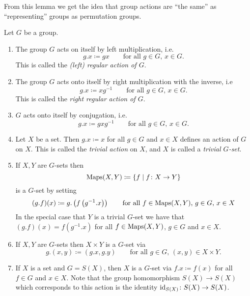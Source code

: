 From this lemma we get the idea that group actions are ``the same'' as ``representing'' groups as permutation groups.


\begin{expls}
  Let $G$ be a group.
  \begin{enumerate}[label=\emph{\alph*)},leftmargin=*]
    \item
      The group $G$ acts on itself by left multiplication, i.e.\
      \[
                  g.x
        \coloneqq gx
        \qquad
        \text{for all $g \in G$, $x \in G$}.
      \]
      This is called the \emph{\textup(left\textup) regular action of $G$}.
    \item
      The group $G$ acts onto itself by right multiplication with the inverse, i.e\
      \[
                  g.x
        \coloneqq xg^{-1}
        \qquad
        \text{for all $g \in G$, $x \in G$}.
      \]
      This is called the \emph{right regular action of $G$}.
    \item
      $G$ acts onto itself by conjugation, i.e.\
      \[
                  g.x
        \coloneqq gxg^{-1}
        \qquad
        \text{for all $g \in G$, $x \in G$}.
      \]
    \item
      Let $X$ be a set.
      Then $g.x \coloneqq x$ for all $g \in G$ and $x \in X$ defines an action of $G$ on $X$.
      This is called the \emph{trivial action} on $X$, and $X$ is called a \emph{trivial $G$-set}.
    \item
      If $X, Y$ are $G$-sets then
      \[
                  \operatorname{Maps}(X,Y)
        \coloneqq \{
                    f
                  \mid
                    f \colon X \to Y
                  \}
      \]
      is a $G$-set by setting
      \[
                  (g.f)(x)
        \coloneqq g.\left( f\left( g^{-1}.x \right) \right)
        \qquad
        \text{for all $f \in \operatorname{Maps}(X,Y)$, $g \in G$, $x \in X$}
      \]
      In the special case that $Y$ is a trivial $G$-set we have that $(g.f)(x) = f(g^{-1}.x)$ for all $f \in \operatorname{Maps}(X,Y)$, $g \in G$ and $x \in X$.
    \item
      If $X, Y$ are $G$-sets then $X \times Y$ is a $G$-set via
      \[
                  g.(x,y)
        \coloneqq (g.x,g.y)
        \qquad
        \text{for all $g \in G$, $(x,y) \in X \times Y$}.
      \]
    \item
      If $X$ is a set and $G = S(X)$, then $X$ is a $G$-set via $f.x \coloneqq f(x)$ for all $f \in G$ and $x \in X$.
      Note that the group homomorphism $S(X) \to S(X)$ which corresponds to this action is the identity $\operatorname{id}_{S(X)} \colon S(X) \to S(X)$.
  \end{enumerate}
\end{expls}


